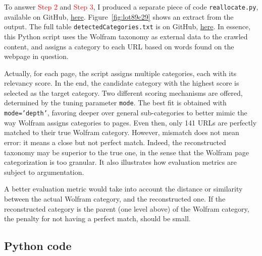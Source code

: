 \documentclass[oneside,10pt]{book}
\begin{document}
To answer \textcolor{red}{Step 2} and \textcolor{red}{Step 3}, I produced a separate piece of code \texttt{reallocate.py}, available on GitHub, 
\href{https://github.com/VincentGranville/Large-Language-Models/blob/main/xllm6/build-taxonomy/reallocate.py}{here}. 
Figure~\ref{fig:lot89c29} shows an extract from the output. The full table \texttt{detectedCategories.txt} is on GitHub,
\href{https://github.com/VincentGranville/Large-Language-Models/blob/main/xllm6/build-taxonomy/detectedCategories.txt}{here}.
In essence, this Python script uses the Wolfram taxonomy as external data to the crawled content, and assigns a category to each URL based on words
 found on the webpage in question. 

Actually, for each page, the script assigns multiple categories, each with its relevancy score. In the end,
the candidate category with the highest score is selected as the target category. Two different scoring mechanisms are offered, 
 determined by the tuning parameter \texttt{mode}. The best fit is obtained with \texttt{mode='depth'}, favoring deeper over general sub-categories 
 to better mimic the way Wolfram assigns categories to pages.  Even then, only 141 URLs are perfectly
 matched to their true Wolfram category. However, mismatch does not mean error: it means a close but not perfect match. Indeed, the
 reconstructed taxonomy may be superior to the true one, in the sense that the Wolfram page categorization is too granular.
It also illustrates how evaluation metrics are subject to argumentation.

A better evaluation metric would take into account the distance or similarity between the actual Wolfram category, and the reconstructed one. If the
 reconstructed category is the parent (one level above) of the Wolfram category, the penalty for not having a perfect match, should be small. 

 









\subsection{Python code}\label{pyucd}
\end{document}
